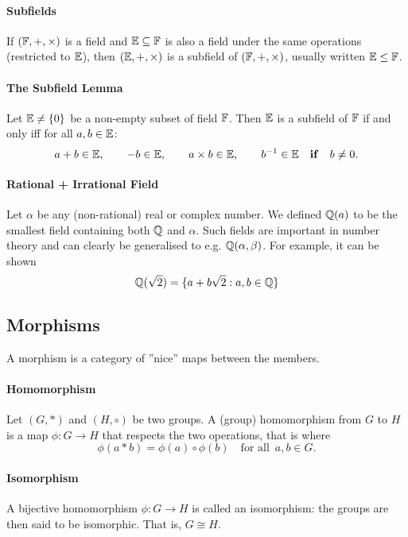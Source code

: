 \paragraph{Subfields}
If \((\mathbb{F}, +, \times)\) is a field and \(\mathbb{E} \subseteq \mathbb{F}\) is also a field under the same operations (restricted to \(\mathbb{E}\)), then \((\mathbb{E}, +, \times)\) is a subfield of \((\mathbb{F}, +, \times)\), usually written \(\mathbb{E} \leq \mathbb{F}\).

\paragraph{The Subfield Lemma}
Let \(\mathbb{E} \neq \{0\}\) be a non-empty subset of field \(\mathbb{F}\). Then \(\mathbb{E}\) is a subfield of \(\mathbb{F}\) if and only iff for all \(a,b \in \mathbb{E}\):
\[a + b \in \mathbb{E}, \qquad -b \in \mathbb{E}, \qquad a \times b \in \mathbb{E}, \qquad b^{-1} \in \mathbb{E} \quad \text{\textbf{if}} \quad  b \neq 0.\]

\paragraph{Rational + Irrational Field}
Let \(\alpha\) be any (non-rational) real or complex number. We defined \(\mathbb{Q}(a)\) to be the smallest field containing both \(\mathbb{Q}\) and \(\alpha\). Such fields are important in number theory and can clearly be generalised to e.g. \(\mathbb{Q}(\alpha, \beta)\). For example, it can be shown
\[\mathbb{Q}(\sqrt{2}) = \{a + b\sqrt{2}: a,b \in \mathbb{Q}\}\]

\subsection{Morphisms}
A morphism is a category of ''nice'' maps between the members.

\paragraph{Homomorphism}
Let \((G, *)\) and \((H, \circ)\) be two groups. A (group) homomorphism from \(G\) to \(H\) is a map \(\phi: G \to H\) that respects the two operations, that is where
\[\phi(a*b) = \phi(a) \circ \phi(b) \quad \text{for all } \, a,b \in G.\]

\paragraph{Isomorphism}
A bijective homomorphism \(\phi: G \to H\) is called an isomorphism: the groups are then said to be isomorphic. That is, \(G \cong H\).

